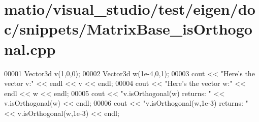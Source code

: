 \hypertarget{matio_2visual__studio_2test_2eigen_2doc_2snippets_2_matrix_base__is_orthogonal_8cpp_source}{}\section{matio/visual\+\_\+studio/test/eigen/doc/snippets/\+Matrix\+Base\+\_\+is\+Orthogonal.cpp}
\label{matio_2visual__studio_2test_2eigen_2doc_2snippets_2_matrix_base__is_orthogonal_8cpp_source}

\begin{DoxyCode}
00001 Vector3d v(1,0,0);
00002 Vector3d w(1e-4,0,1);
00003 cout << \textcolor{stringliteral}{"Here's the vector v:"} << endl << v << endl;
00004 cout << \textcolor{stringliteral}{"Here's the vector w:"} << endl << w << endl;
00005 cout << \textcolor{stringliteral}{"v.isOrthogonal(w) returns: "} << v.isOrthogonal(w) << endl;
00006 cout << \textcolor{stringliteral}{"v.isOrthogonal(w,1e-3) returns: "} << v.isOrthogonal(w,1e-3) << endl;
\end{DoxyCode}
